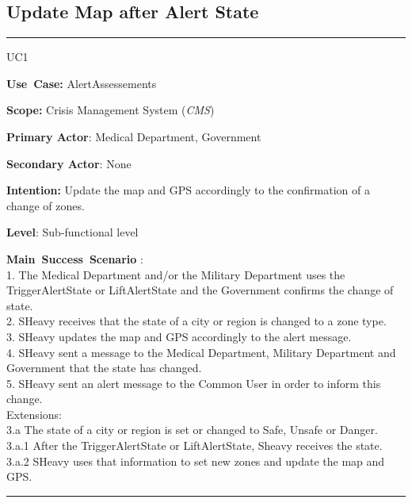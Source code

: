 \subsection{Update Map after Alert State}
\vspace{0.5cm}
\hrule
\vspace{0.5cm}
\begin{lyxlist}{UC1}
\small{
\item [\textbf{Use~Case:}] AlertAssessements
\item [\textbf{Scope:}] Crisis Management System (\emph{CMS})
\item [\textbf{Primary Actor}:] Medical Department, Government
\item [\textbf{Secondary Actor}:] None
\item [\textbf{Intention:}] Update the map and GPS accordingly to 
the confirmation of a change of zones.
\item [\textbf{Level}:]Sub-functional level
\item [\textbf{Main~Success~Scenario}]:\\
1.	The Medical Department and/or the Military Department uses the TriggerAlertState
 or LiftAlertState and the Government confirms the change of state.\\
2.	SHeavy receives that the state of a city or region is changed to a zone
type.\\
3.	SHeavy updates the map and GPS accordingly to the alert message.\\
4.	SHeavy sent a message to the Medical Department, Military Department and Government 
that the state has changed.\\
5.	SHeavy sent an alert message to the Common User in order to inform this
change.\\
Extensions:\\
	3.a The state of a city or region is set or changed to Safe, Unsafe or
	Danger.\\
		3.a.1 After the TriggerAlertState or LiftAlertState, Sheavy receives the
		state.\\
		3.a.2 SHeavy uses that information to set new zones and update the map and
		GPS.\\
}
\end{lyxlist}
\hrule
\vspace{0.5cm} 

